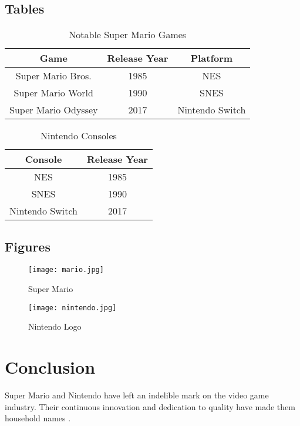 \documentclass[conference]{IEEEtran}
\begin{document}
\subsection{Tables}

\begin{table}[h!]
\centering
\begin{tabular}{|c|c|c|}
\hline
Game & Release Year & Platform \\
\hline
Super Mario Bros. & 1985 & NES \\
Super Mario World & 1990 & SNES \\
Super Mario Odyssey & 2017 & Nintendo Switch \\
\hline
\end{tabular}
\caption{Notable Super Mario Games}
\label{table:games}
\end{table}

\begin{table}[h!]
\centering
\begin{tabular}{|c|c|}
\hline
Console & Release Year \\
\hline
NES & 1985 \\
SNES & 1990 \\
Nintendo Switch & 2017 \\
\hline
\end{tabular}
\caption{Nintendo Consoles}
\label{table:consoles}
\end{table}

\subsection{Figures}

\begin{figure}[h!]
\centering
\texttt{[image: mario.jpg]}
\caption{Super Mario}
\label{fig:mario}
\end{figure}

\begin{figure}[h!]
\centering
\texttt{[image: nintendo.jpg]}
\caption{Nintendo Logo}
\label{fig:nintendo}
\end{figure}

\section{Conclusion}
Super Mario and Nintendo have left an indelible mark on the video game industry. Their continuous innovation and dedication to quality have made them household names \cite{ref9, ref10}.

\printbibliography
\end{document}
